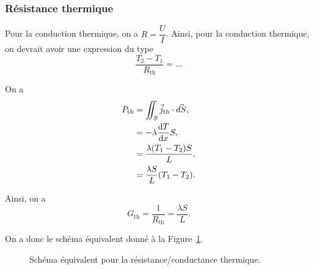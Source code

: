         \subsubsection{Résistance thermique}

            Pour la conduction thermique, on a $R=\dfrac{U}{I}$. Ainsi, pour la conduction thermique, on devrait avoir une expression du type
            \begin{equation*}
                \frac{T_2-T_1}{R_{\text{th}}}=\dots
            \end{equation*}

            On a 
            \begin{align*}
                P_{\text{th}}
                &=\iint_{S}\vec{j}_{\text{th}}\cdot\vec{dS},\\
                &=
                -\lambda\frac{\mathrm{d} T}{\mathrm{d} x}S,\\
                &=
                \frac{\lambda(T_1-T_2)S}{L},\\
                &=\frac{\lambda S}{L}(T_1-T_2).
            \end{align*}

            Ainsi, on a 
            \begin{equation*}
                \boxed{
                    G_{\text{th}}=\frac{1}{R_{\text{th}}}=\frac{\lambda S}{L}.
                }
            \end{equation*}

            On a donc le schéma équivalent donné à la Figure~\ref{fig:schema_equivalent_resistance_conductance_thermique}.
            \begin{figure}
                \centering
                \caption{Schéma équivalent pour la résistance/conductance thermique.}    
                \label{fig:schema_equivalent_resistance_conductance_thermique}
            \end{figure}

